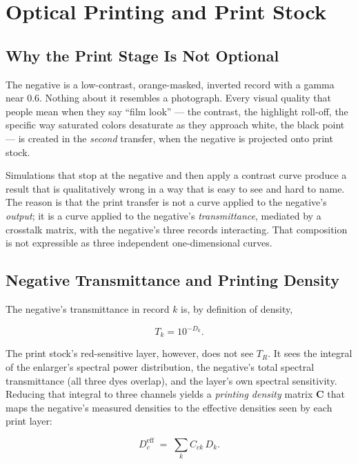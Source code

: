 \section{Optical Printing and Print Stock}
\label{sec:print}

\subsection{Why the Print Stage Is Not Optional}

The negative is a low-contrast, orange-masked, inverted record with a gamma near
$0.6$. Nothing about it resembles a photograph. Every visual quality that people
mean when they say ``film look'' --- the contrast, the highlight roll-off, the
specific way saturated colors desaturate as they approach white, the black point
--- is created in the \emph{second} transfer, when the negative is projected onto
print stock.

Simulations that stop at the negative and then apply a contrast curve produce a
result that is qualitatively wrong in a way that is easy to see and hard to
name. The reason is that the print transfer is not a curve applied to the
negative's \emph{output}; it is a curve applied to the negative's
\emph{transmittance}, mediated by a crosstalk matrix, with the negative's three
records interacting. That composition is not expressible as three independent
one-dimensional curves.

\subsection{Negative Transmittance and Printing Density}

The negative's transmittance in record $k$ is, by definition of density,

\begin{equation}
T_k = 10^{-D_k}.
\end{equation}

The print stock's red-sensitive layer, however, does not see $T_R$. It sees the
integral of the enlarger's spectral power distribution, the negative's total
spectral transmittance (all three dyes overlap), and the layer's own spectral
sensitivity. Reducing that integral to three channels yields a
\emph{printing density} matrix $\mathbf{C}$ that maps the negative's measured
densities to the effective densities seen by each print layer:

\begin{equation}
D^{\mathrm{eff}}_c \;=\; \sum_{k} C_{ck}\, D_k .
\label{eq:printdensity}
\end{equation}

